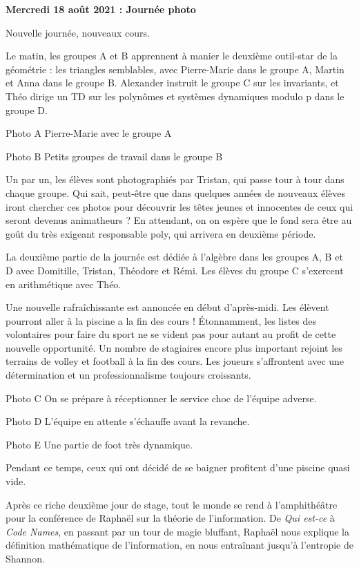 \begin{center}
{\textbf{Mercredi 18 août 2021 : Journée photo}}
\end{center}
\vspace{2mm}

Nouvelle journée, nouveaux cours.

Le matin, les groupes A et B apprennent à manier le deuxième outil-star de la géométrie : les triangles semblables, avec Pierre-Marie dans le groupe A, Martin et Anna dans le groupe B. Alexander instruit le groupe C sur les invariants, et Théo dirige un TD sur les polynômes et systèmes dynamiques modulo p dans le groupe D.

Photo A
Pierre-Marie avec le groupe A

Photo B
Petits groupes de travail dans le groupe B

Un par un, les élèves sont photographiés par Tristan, qui passe tour à tour dans chaque groupe. Qui sait, peut-être que dans quelques années de nouveaux élèves iront chercher ces photos pour découvrir les têtes jeunes et innocentes de ceux qui seront devenus animatheurs ? En attendant, on on espère que le fond sera être au goût du très exigeant responsable poly, qui arrivera en deuxième période.

La deuxième partie de la journée est dédiée à l’algèbre dans les groupes A, B et D avec Domitille, Tristan, Théodore et Rémi. Les élèves du groupe C s’exercent en arithmétique avec Théo.

Une nouvelle rafraîchissante est annoncée en début d’après-midi. Les élèvent pourront aller à la piscine a la fin des cours ! Étonnamment, les listes des volontaires pour faire du sport ne se vident pas pour autant au profit de cette nouvelle opportunité. Un nombre de stagiaires encore plus important rejoint les terrains de volley et football à la fin des cours. Les joueurs s’affrontent avec une détermination et un professionnalisme toujours croissants.

Photo C
On se prépare à réceptionner le service choc de l’équipe adverse.

Photo D
L’équipe en attente s’échauffe avant la revanche.

Photo E
Une partie de foot très dynamique.

Pendant ce temps, ceux qui ont décidé de se baigner profitent d’une piscine quasi vide.

Après ce riche deuxième jour de stage, tout le monde se rend à l’amphithéâtre pour la conférence de Raphaël sur la théorie de l’information. De \textit{Qui est-ce} à \textit{Code Names}, en passant par un tour de magie bluffant, Raphaël nous explique la définition mathématique de l’information, en nous entraînant jusqu’à l’entropie de Shannon.

